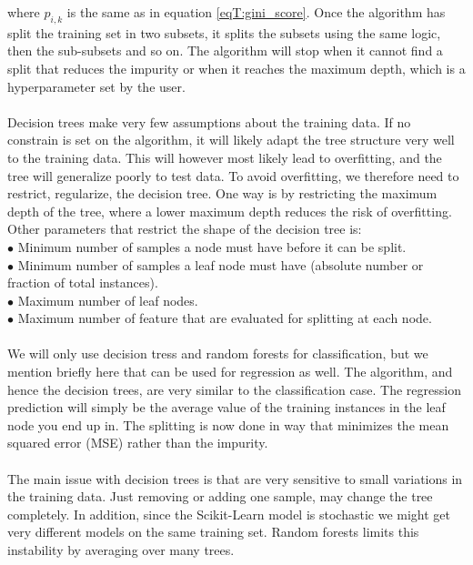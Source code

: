 \documentclass[12pt]{article}
\numberwithin{figure}{section}
\begin{document}
where $p_{i,k}$ is the same as in equation \ref{eqT:gini_score}. Once the algorithm has split the training set in two subsets, it splits the subsets using the same logic, then the sub-subsets and so on. The algorithm will stop when it cannot find a split that reduces the impurity or when it reaches the maximum depth, which is a hyperparameter set by the user. \\ \\
Decision trees make very few assumptions about the training data. If no constrain is set on the algorithm, it will likely adapt the tree structure very well to the training data. This will however most likely lead to overfitting, and the tree will generalize poorly to test data. To avoid overfitting, we therefore need to restrict, regularize, the decision tree. One way is by restricting the maximum depth of the tree, where a lower maximum depth reduces the risk of overfitting. Other parameters that restrict the shape of the decision tree is:\\
$\bullet$ Minimum number of samples a node must have before it can be split.\\
$\bullet$ Minimum number of samples a leaf node must have (absolute number or fraction of total instances).\\
$\bullet$ Maximum number of leaf nodes.\\
$\bullet$ Maximum number of feature that are evaluated for splitting at each node.\\ \\
We will only use decision tress and random forests for classification, but we mention briefly here that can be used for regression as well. The algorithm, and hence the decision trees, are very similar to the classification case. The regression prediction will simply be the average value of the training instances in the leaf node you end up in. The splitting is now done in way that minimizes the mean squared error (MSE) rather than the impurity.\\ \\
The main issue with decision trees is that are very sensitive to small variations in the training data. Just removing or adding one sample, may change the tree completely. In addition, since the Scikit-Learn model is stochastic we might get very different models on the same training set.  Random forests limits this instability by averaging over many trees.\\ \\
\end{document}
